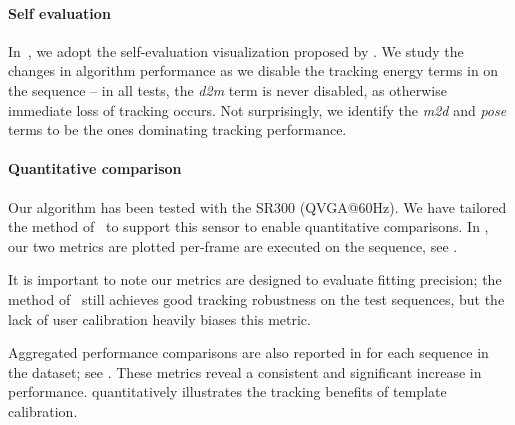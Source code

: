 

\paragraph{Self evaluation}
% 
In~, we adopt the self-evaluation visualization proposed by \cite{taylor2016concerto}. We study the changes in algorithm performance as we disable the tracking energy terms in  on the  sequence -- in all tests, the \emph{d2m} term is never disabled, as otherwise immediate loss of tracking occurs. Not surprisingly, we identify the \emph{m2d} and \emph{pose} terms to be the ones dominating tracking performance. 
% 
% 


\paragraph{Quantitative comparison}
Our algorithm has been tested with the \realsense{} SR300 (QVGA@60Hz).  We have tailored the method of~\cite{tagliasacchi2015robust} to support this sensor to enable quantitative comparisons. In , our two metrics are plotted per-frame  are executed on the  sequence,  see \VideoHTrack{}. 
\begin{draft}
It is important to note our metrics are designed to evaluate fitting precision; the method of~\cite{sharp2015accurate} still achieves good tracking robustness on the test sequences, but the lack of user calibration heavily biases this metric.
\end{draft}
Aggregated performance comparisons are also reported in  for each sequence in the \handy{} dataset; see \VideoExtra{}. These metrics reveal a consistent and significant increase in performance.  quantitatively illustrates the tracking benefits of template calibration.

